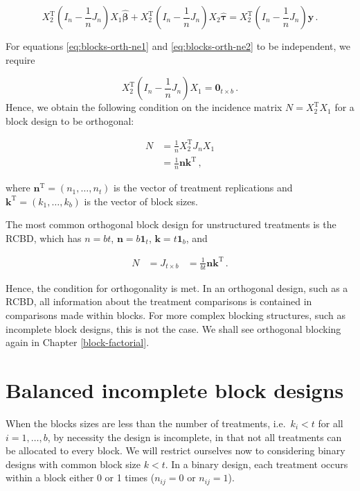 \documentclass[
]{book}
\theoremstyle{definition}
\theoremstyle{definition}
\theoremstyle{definition}
\theoremstyle{definition}
\theoremstyle{remark}
\begin{document}
\begin{equation}
X_2^{\mathrm{T}}\left(I_n - \frac{1}{n}J_n\right)X_1\hat{\boldsymbol{\beta}} + X_2^{\mathrm{T}}\left(I_n - \frac{1}{n}J_n\right)X_2\hat{\boldsymbol{\tau}} = X_2^{\mathrm{T}}\left(I_n - \frac{1}{n}J_n\right)\boldsymbol{y}\,.
\label{eq:blocks-orth-ne2}
\end{equation}

For equations \eqref{eq:blocks-orth-ne1} and \eqref{eq:blocks-orth-ne2} to be independent, we require

\[
X_2^{\mathrm{T}}\left(I_n - \frac{1}{n}J_n\right)X_1 = \boldsymbol{0}_{t\times b}\,.
\]
Hence, we obtain the following condition on the incidence matrix \(N = X_2^{\mathrm{T}}X_1\) for a block design to be orthogonal:

\begin{align}
N & = \frac{1}{n}X_2^{\mathrm{T}}J_nX_1 \\
& = \frac{1}{n}\boldsymbol{n}\boldsymbol{k}^{\mathrm{T}}\,,
\end{align}

where \(\boldsymbol{n}^{\mathrm{T}} = (n_1,\ldots, n_t)\) is the vector of treatment replications and \(\boldsymbol{k}^{\mathrm{T}} = (k_1,\ldots, k_b)\) is the vector of block sizes.

The most common orthogonal block design for unstructured treatments is the RCBD, which has \(n = bt\), \(\boldsymbol{n} = b\boldsymbol{1}_t\), \(\boldsymbol{k} = t\boldsymbol{1}_b\), and

\begin{align}
N & = J_{t \times b}
& = \frac{1}{bt}\boldsymbol{n}\boldsymbol{k}^{\mathrm{T}}\,.
\end{align}

Hence, the condition for orthogonality is met. In an orthogonal design, such as a RCBD, all information about the treatment comparisons is contained in comparisons made within blocks. For more complex blocking structures, such as incomplete block designs, this is not the case. We shall see orthogonal blocking again in Chapter \ref{block-factorial}.

\hypertarget{balanced-incomplete-block-designs}{%
\section{Balanced incomplete block designs}\label{balanced-incomplete-block-designs}}

When the blocks sizes are less than the number of treatments, i.e.~\(k_i < t\) for all \(i=1,\ldots, b\), by necessity the design is incomplete, in that not all treatments can be allocated to every block. We will restrict ourselves now to considering binary designs with common block size \(k<t\). In a binary design, each treatment occurs within a block either 0 or 1 times (\(n_{ij}=0\) or \(n_{ij}=1\)).
\end{document}
